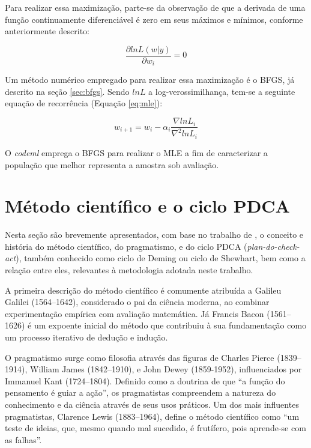 \documentclass[cic,tc]{iiufrgs}
\begin{document}
Para realizar essa maximização, parte-se da observação de que a derivada de uma
função continuamente diferenciável é zero em seus máximos e mínimos, conforme
anteriormente descrito:

\begin{equation}
\label{eq:dl}
\frac{\partial ln L(w|y)}{\partial w_i} = 0
\end{equation}


Um método numérico empregado para realizar essa maximização é o BFGS, já
descrito na seção \ref{sec:bfgs}. Sendo $lnL$ a log-verossimilhança, tem-se a
seguinte equação de recorrência (Equação \ref{eq:mle}):

\begin{equation}
\label{eq:mle}
w_{i+1} = w_i - \alpha_i \frac{\nabla lnL_i}{\nabla^2 lnL_i}
\end{equation}

O \textit{codeml} emprega o BFGS para realizar o MLE a fim de caracterizar a
população que melhor representa a amostra sob avaliação.


\section{Método científico e o ciclo PDCA}
\label{sec:pdca}

Nesta seção são brevemente apresentados, com base no trabalho de
\cite{moen2006evolution}, o conceito e história do método científico, do
pragmatismo, e do ciclo PDCA (\textit{plan-do-check-act}), também conhecido
como ciclo de Deming ou ciclo de Shewhart, bem como a relação entre eles,
relevantes à metodologia adotada neste trabalho.

A primeira descrição do método científico é comumente atribuída a Galileu
Galilei (1564--1642), considerado o pai da ciência moderna, ao combinar
experimentação empírica com avaliação matemática. Já Francis Bacon (1561--1626)
é um expoente inicial do método que contribuiu à sua fundamentação como um
processo iterativo de dedução e indução.

O pragmatismo surge como filosofia através das figuras de Charles Pierce
(1839--1914), William James (1842--1910), e John Dewey (1859-1952),
influenciados por Immanuel Kant (1724--1804). Definido como a doutrina de que
``a função do pensamento é guiar a ação'', os pragmatistas compreendem a
natureza do conhecimento e da ciência através de seus usos práticos. Um dos
mais influentes pragmatistas, Clarence Lewis (1883--1964), define o método
científico como ``um teste de ideias, que, mesmo quando mal sucedido, é
frutífero, pois aprende-se com as falhas''.
\end{document}
